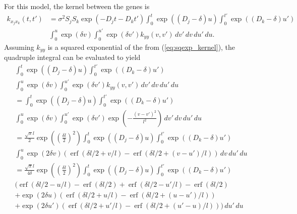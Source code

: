 \documentclass{article}
\newcommand{\erf}{\operatorname{erf}}
\begin{document}
For this model, the kernel between the genes is
\begin{equation}
  \label{eq:gpsimy_genekernel0}
  \begin{split}
    k_{x_j x_k}(t, t') &= \sigma^2 S_j S_k \exp(-D_j t - D_k t')
    \int_0^t \exp((D_j - \delta) u)
    \int_0^{t'} \exp((D_k - \delta) u') \\
    & \int_0^u \exp(\delta v) \int_0^{u'} \exp(\delta v') k_{yy}(v, v') \, dv'\, dv\, du'\, du.
  \end{split}
\end{equation}
Assuming $k_{yy}$ is a squared exponential of the from
(\ref{eq:sqexp_kernel}), the quadruple integral can be evaluated to
yield
\begin{multline}
  \label{eq:gpsimy_kernel1}
  \int_0^t \exp((D_j - \delta) u)
  \int_0^{t'} \exp((D_k - \delta) u') \\
  \int_0^u \exp(\delta v) \int_0^{u'} \exp(\delta v') k_{yy}(v,
  v') \, dv'\, dv\, du'\, du \\
  = 
  \int_0^t \exp((D_j - \delta) u)
  \int_0^{t'} \exp((D_k - \delta) u') \\
  \int_0^u \exp(\delta v) \int_0^{u'} \exp(\delta v')
  \exp\left( -\frac{(v-v')^2}{l^2} \right) \, dv'\, dv\, du'\, du \\
  = 
  \frac{\sqrt{\pi}l}{2}\exp\left(\left(\frac{\delta l}{2}\right)^2\right)
  \int_0^t \exp((D_j - \delta) u)
  \int_0^{t'} \exp((D_k - \delta) u') \\
  \int_0^u \exp(2 \delta v) 
  (\erf(\delta l/2 + v/l) - \erf(\delta l/2 + (v-u')/l))
  \, dv\, du'\, du \\
  =
  \frac{\sqrt{\pi}l}{4\delta}\exp\left(\left(\frac{\delta l}{2}\right)^2\right)
  \int_0^t \exp((D_j - \delta) u)
  \int_0^{t'} \exp((D_k - \delta) u') \\
  \bigg(
  \erf(\delta l/2 - u/l) - \erf(\delta l/2)
  + \erf(\delta l/2 - u'/l) - \erf(\delta l/2) \\
  + \exp(2 \delta u) (\erf(\delta l/2 + u/l) - \erf(\delta l/2 +
  (u-u')/l)) \\
  + \exp(2 \delta u') (\erf(\delta l/2 + u'/l) - \erf(\delta l/2
  + (u'-u)/l))
  \bigg)
  \, du'\, du
\end{multline}
\end{document}
